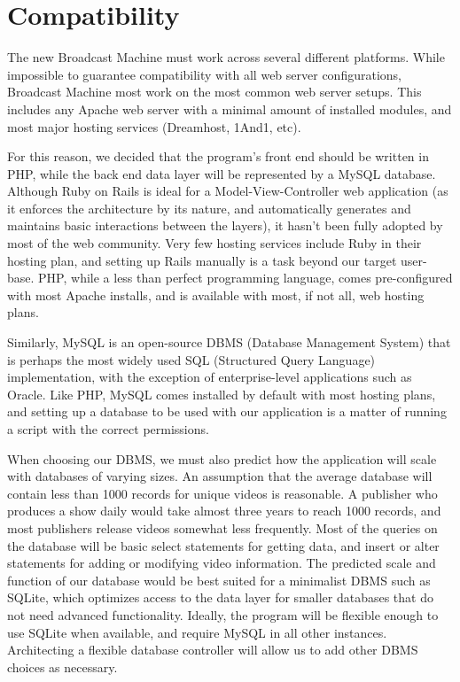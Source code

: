 \documentclass[a4paper,12pt]{report}
\begin{document}
\section{Compatibility}

The new Broadcast Machine must work across several different platforms. While impossible to guarantee compatibility with all web server configurations, Broadcast Machine most work on the most common web server setups. This includes any Apache web server with a minimal amount of installed modules, and most major hosting services (Dreamhost, 1And1, etc). 

For this reason, we decided that the program’s front end should be written in PHP, while the back end data layer will be represented by a MySQL database. Although Ruby on Rails is ideal for a Model-View-Controller web application (as it enforces the architecture by its nature, and automatically generates and maintains basic interactions between the layers), it hasn’t been fully adopted by most of the web community. Very few hosting services include Ruby in their hosting plan, and setting up Rails manually is a task beyond our target user-base. PHP, while a less than perfect programming language, comes pre-configured with most Apache installs, and is available with most, if not all, web hosting plans. 

Similarly, MySQL is an open-source DBMS (Database Management System) that is perhaps the most widely used SQL (Structured Query Language) implementation, with the exception of enterprise-level applications such as Oracle. Like PHP, MySQL comes installed by default with most hosting plans, and setting up a database to be used with our application is a matter of running a script with the correct permissions. 

When choosing our DBMS, we must also predict how the application will scale with databases of varying sizes. An assumption that the average database will contain less than 1000 records for unique videos is reasonable. A publisher who produces a show daily would take almost three years to reach 1000 records, and most publishers release videos somewhat less frequently. Most of the queries on the database will be basic select statements for getting data, and insert or alter statements for adding or modifying video information. The predicted scale and function of our database would be best suited for a minimalist DBMS such as SQLite, which optimizes access to the data layer for smaller databases that do not need advanced functionality. Ideally, the program will be flexible enough to use SQLite when available, and require MySQL in all other instances. Architecting a flexible database controller will allow us to add other DBMS choices as necessary.
\end{document}
